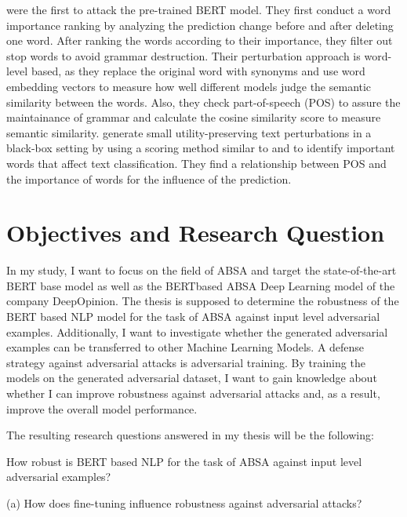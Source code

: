 \cite{jin2019bert} were the first to attack the pre-trained BERT model. They first conduct a word importance ranking by analyzing the prediction change before and after deleting one word. After ranking the words according to their importance, they filter out stop words to avoid grammar destruction. Their perturbation approach is word-level based, as they replace the original word with synonyms and use word embedding vectors to measure how well different models judge the semantic similarity between the words. Also, they check part-of-speech (POS) to assure the maintainance of grammar and calculate the cosine similarity score to measure semantic similarity. \cite{goodman2020fastwordbug} generate small utility-preserving text perturbations in a black-box setting by using a scoring method similar to \cite{gao2018black} and \cite{jin2019bert} to identify important words that affect text classification. They find a relationship between POS and the importance of words for the influence of the prediction. 

\section{Objectives and Research Question}

In my study, I want to focus on the field of ABSA and target the state-of-the-art BERT base model as well as the BERTbased ABSA Deep Learning model of the company DeepOpinion. The thesis is supposed to determine the robustness of the BERT based NLP model for the task of ABSA against input level adversarial examples.
Additionally, I want to investigate whether the generated adversarial examples can be transferred to other Machine Learning Models. A defense strategy against adversarial attacks is adversarial training. By training the models on the generated adversarial dataset, I want to gain knowledge about whether I can improve robustness against adversarial attacks and, as a result, improve the overall model performance.

The resulting research questions answered in my thesis will be the following:

How robust is BERT based NLP for the task of ABSA against input level adversarial examples?

(a) How does fine-tuning influence robustness against adversarial attacks?


